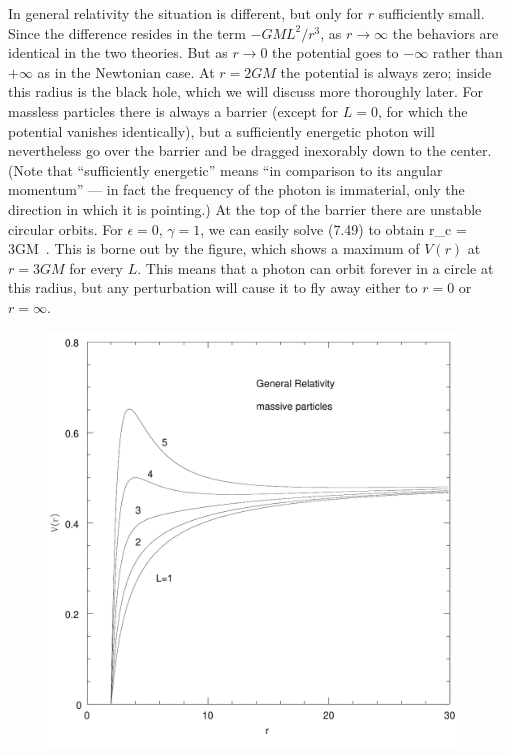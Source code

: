 \documentclass[12pt]{article}
\begin{document}
In general relativity the situation is different, but only for $r$ 
sufficiently small.  Since the difference resides in the term $-GML^2/r^3$,
as $r\rightarrow\infty$ the behaviors are identical in the two 
theories.  But as $r\rightarrow 0$ the potential goes to $-\infty$
rather than $+\infty$ as in the Newtonian case.  At $r=2GM$ the 
potential is always zero; inside this radius is the black hole, which
we will discuss more thoroughly later.   For massless particles
there is always a barrier (except for $L=0$, for which the potential
vanishes identically), but a sufficiently energetic photon will
nevertheless go over the barrier and be dragged inexorably down to
the center.  (Note that ``sufficiently energetic'' means ``in comparison
to its angular momentum'' --- in fact the frequency of the photon is
immaterial, only the direction in which it is pointing.)  At the top
of the barrier there are unstable circular orbits.
For $\epsilon=0$, $\gamma=1$, we can easily solve (7.49) to obtain
\be
  r_c = 3GM\ .\label{7.51}
\ee
This is borne out by the figure, which shows a maximum of $V(r)$ at
$r=3GM$ for every $L$.  This means that a photon can orbit forever in
a circle at this radius, but any 
perturbation will cause it to fly away either to $r=0$ or
$r=\infty$.

\begin{figure}
  \centerline{
  \includegraphics[height=11cm]{pdf/seven6}}
  \vskip-2cm
\end{figure}
\end{document}
